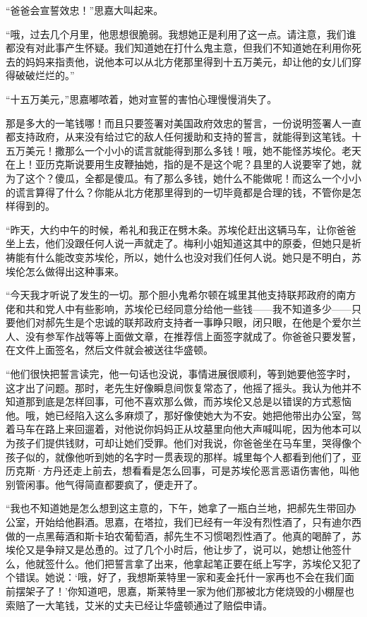 \par “爸爸会宣誓效忠！”思嘉大叫起来。
\par “哦，过去几个月里，他思想很脆弱。我想她正是利用了这一点。请注意，我们谁都没有对此事产生怀疑。我们知道她在打什么鬼主意，但我们不知道她在利用你死去的妈妈来指责他，说他本可以从北方佬那里得到十五万美元，却让他的女儿们穿得破破烂烂的。”
\par “十五万美元，”思嘉嘟哝着，她对宣誓的害怕心理慢慢消失了。
\par 那是多大的一笔钱哪！而且只要签署对美国政府效忠的誓言，一份说明签署人一直都支持政府，从来没有给过它的敌人任何援助和支持的誓言，就能得到这笔钱。十五万美元！撒那么一个小小的谎言就能得到那么多钱！哦，她不能怪苏埃伦。老天在上！亚历克斯说要用生皮鞭抽她，指的是不是这个呢？县里的人说要宰了她，就为了这个？傻瓜，全都是傻瓜。有了那么多钱，她什么不能做呢！而这么一个小小的谎言算得了什么？你能从北方佬那里得到的一切毕竟都是合理的钱，不管你是怎样得到的。
\par “昨天，大约中午的时候，希礼和我正在劈木条。苏埃伦赶出这辆马车，让你爸爸坐上去，他们没跟任何人说一声就走了。梅利小姐知道这其中的原委，但她只是祈祷能有什么能改变苏埃伦，所以，她什么也没对我们任何人说。她只是不明白，苏埃伦怎么做得出这种事来。
\par “今天我才听说了发生的一切。那个胆小鬼希尔顿在城里其他支持联邦政府的南方佬和共和党人中有些影响，苏埃伦已经同意分给他一些钱——我不知道多少——只要他们对郝先生是个忠诚的联邦政府支持者一事睁只眼，闭只眼，在他是个爱尔兰人、没有参军作战等等上面做文章，在推荐信上面签字就成了。你爸爸只要发誓，在文件上面签名，然后文件就会被送往华盛顿。
\par “他们很快把誓言读完，他一句话也没说，事情进展很顺利，等到她要他签字时，这才出了问题。那时，老先生好像瞬息间恢复常态了，他摇了摇头。我认为他并不知道那到底是怎样回事，可他不喜欢那么做，而苏埃伦又总是以错误的方式惹恼他。哦，她已经陷入这么多麻烦了，那好像使她大为不安。她把他带出办公室，驾着马车在路上来回遛着，对他说你妈妈正从坟墓里向他大声喊叫呢，因为他本可以为孩子们提供钱财，可却让她们受罪。他们对我说，你爸爸坐在马车里，哭得像个孩子似的，就像他听到她的名字时一贯表现的那样。城里每个人都看到他们了，亚历克斯·方丹还走上前去，想看看是怎么回事，可是苏埃伦恶言恶语伤害他，叫他别管闲事。他气得简直都要疯了，便走开了。
\par “我也不知道她是怎么想到这主意的，下午，她拿了一瓶白兰地，把郝先生带回办公室，开始给他斟酒。思嘉，在塔拉，我们已经有一年没有烈性酒了，只有迪尔西做的一点黑莓酒和斯卡珀农葡萄酒，郝先生不习惯喝烈性酒了。他真的喝醉了，苏埃伦又是争辩又是怂恿的。过了几个小时后，他让步了，说可以，她想让他签什么，他就签什么。他们把誓言拿了出来，他拿起笔正要在纸上写字，苏埃伦又犯了个错误。她说：‘哦，好了，我想斯莱特里一家和麦金托什一家再也不会在我们面前摆架子了！’你知道吧，思嘉，斯莱特里一家为他们那被北方佬烧毁的小棚屋也索赔了一大笔钱，艾米的丈夫已经让华盛顿通过了赔偿申请。
